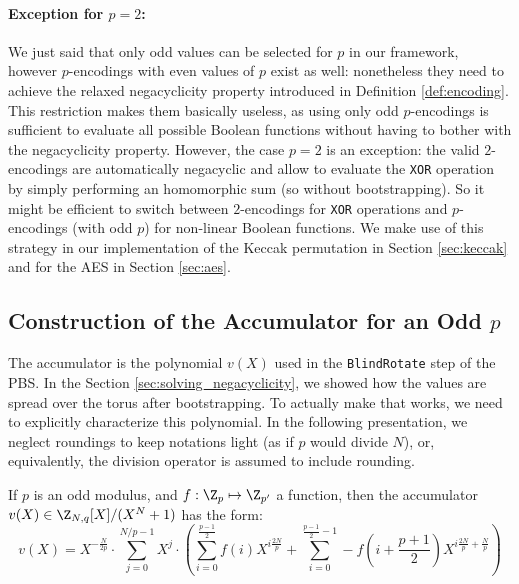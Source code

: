 \paragraph{Exception for $p=2$:} We just said that only odd values can be selected for $p$ in our framework, however $p$-encodings with even values of $p$ exist as well: nonetheless they need to achieve the relaxed negacyclicity property introduced in Definition \ref{def:encoding}. This restriction makes them basically useless, as using only odd $p$-encodings is sufficient to evaluate all possible Boolean functions without having to bother with the negacyclicity property. However, the case $p=2$ is an exception: the valid $2$-encodings are automatically negacyclic and allow to evaluate the \texttt{XOR} operation by simply performing an homomorphic sum (so without bootstrapping). So it might be efficient to switch between $2$-encodings for \texttt{XOR} operations and $p$-encodings (with odd $p$) for non-linear Boolean functions. We make use of this strategy in our implementation of the Keccak permutation in Section \ref{sec:keccak} and for the AES in Section \ref{sec:aes}.



\subsection{Construction of the Accumulator for an Odd $p$}
\label{sec:accumulator}


The accumulator is the polynomial $v(X)$ used in the \texttt{BlindRotate} step of the PBS. In the Section \ref{sec:solving_negacyclicity}, we showed how the values are spread over the torus after bootstrapping. To actually make that works, we need to explicitly characterize this polynomial. In the following presentation, we neglect roundings to keep notations light (as if $p$ would divide $N$), or, equivalently, the division operator is assumed to include rounding.

\begin{definition}
    If $p$ is an odd modulus, and $f: \Z_p \mapsto \Z_{p'}$ a function, then the accumulator $v(X) \in \Z_{N, q}[X]/(X^N+1)$ has the form:\[v(X) = X^{- \frac {N} {2p}} \cdot \sum_{j=0}^{N/p - 1} X^j  \cdot \left ( \sum_{i=0}^{\frac{p-1}{2}} f(i) X^{i \frac{2N}{p}} + \sum_{i=0}^{\frac{p-1}{2} - 1} -f \left (i + \frac{p+1}{2} \right ) X^{i \frac{2N}{p} + \frac N p} \right )\]
\end{definition}


